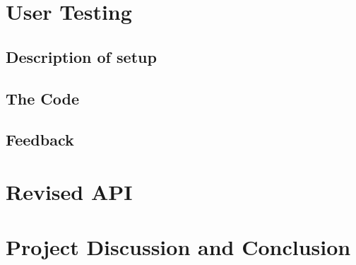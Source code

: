 \documentclass[12pt]{article}
\begin{document}
\section{User Testing}

\subsection{Description of setup}

\subsection{The Code}

\subsection{Feedback}

\section{Revised API}

\section{Project Discussion and Conclusion}
\end{document}
